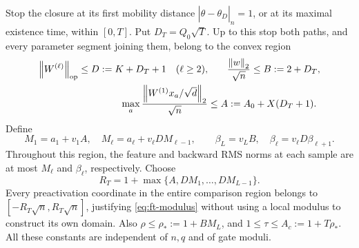 Stop the closure at its first mobility distance
$|\widehat\theta-\theta_D|_n=1$, or at its
maximal existence time, within $[0,T]$.  Put $D_T=Q_0\sqrt T$.
Up to this stop both paths, and every parameter segment joining them,
belong to the convex region
\begin{equation}
 \begin{aligned}
 \left\lVert W^{(\ell)}\right\rVert_{\mathrm{op}}\le D:=K+D_T+1\quad(\ell\ge2),
 &\qquad\frac{\left\lVert w\right\rVert_2}{\sqrt n}\le B:=2+D_T,\\
 \max_a\frac{\left\lVert W^{(1)}x_a/\sqrt d\right\rVert_2}{\sqrt n}
       &\le A:=A_0+X(D_T+1).
 \end{aligned}
 \label{eq:ft-region}
\end{equation}
Define
\[
 M_1=a_1+v_1A,\quad M_\ell=a_\ell+v_\ell DM_{\ell-1},\qquad
 \beta_L=v_LB,\quad\beta_\ell=v_\ell D\beta_{\ell+1}.
\]
Throughout this region, the feature and backward RMS norms at each sample
are at most $M_\ell$ and $\beta_\ell$, respectively.  Choose
\[
 R_T=1+\max\{A,DM_1,\ldots,DM_{L-1}\}.
\]
Every preactivation coordinate in the entire comparison region belongs
to $[-R_T\sqrt n,R_T\sqrt n]$, justifying \eqref{eq:ft-modulus} without
using a local modulus to construct its own domain.  Also
$\rho\le\rho_*:=1+BM_L$, and
$1\le\tau\le A_c:=1+T\rho_*$.
All these constants are independent of $n,q$ and of gate moduli.

